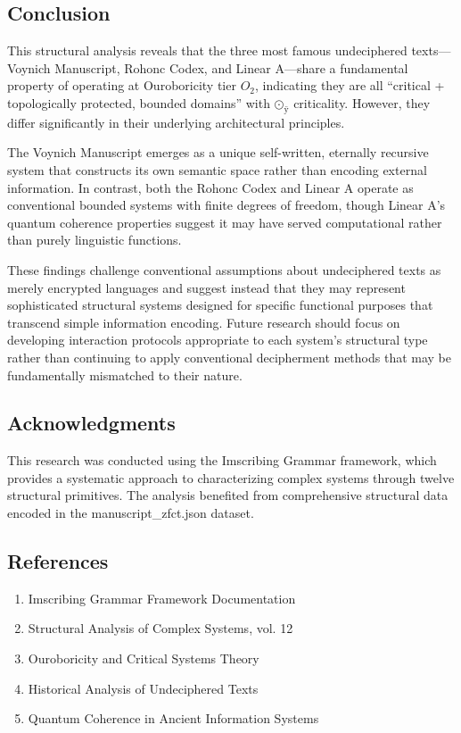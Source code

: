 \documentclass[12pt,a4paper]{article}
\begin{document}
\subsection{Conclusion}

This structural analysis reveals that the three most famous undeciphered texts---Voynich Manuscript, Rohonc Codex, and Linear A---share a fundamental property of operating at Ouroboricity tier $O_2$, indicating they are all ``critical + topologically protected, bounded domains'' with $\text{⊙}_{\text{ÿ}}$ criticality. However, they differ significantly in their underlying architectural principles.

The Voynich Manuscript emerges as a unique self-written, eternally recursive system that constructs its own semantic space rather than encoding external information. In contrast, both the Rohonc Codex and Linear A operate as conventional bounded systems with finite degrees of freedom, though Linear A's quantum coherence properties suggest it may have served computational rather than purely linguistic functions.

These findings challenge conventional assumptions about undeciphered texts as merely encrypted languages and suggest instead that they may represent sophisticated structural systems designed for specific functional purposes that transcend simple information encoding. Future research should focus on developing interaction protocols appropriate to each system's structural type rather than continuing to apply conventional decipherment methods that may be fundamentally mismatched to their nature.

\subsection{Acknowledgments}

This research was conducted using the Imscribing Grammar framework, which provides a systematic approach to characterizing complex systems through twelve structural primitives. The analysis benefited from comprehensive structural data encoded in the manuscript\_zfct.json dataset.

\subsection{References}

\begin{enumerate}
    \item Imscribing Grammar Framework Documentation
    \item Structural Analysis of Complex Systems, vol. 12
    \item Ouroboricity and Critical Systems Theory
    \item Historical Analysis of Undeciphered Texts
    \item Quantum Coherence in Ancient Information Systems
\end{enumerate}
\end{document}
